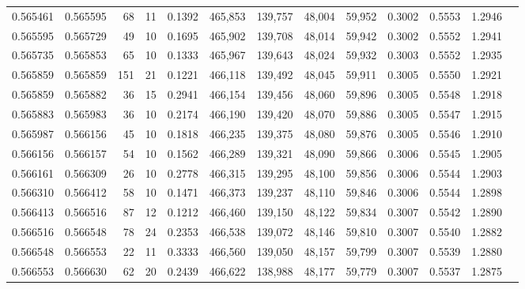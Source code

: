 \begin{tabular}{rrrrrrrrrrrrr}
0.565461 & 0.565595 &    68 &  11 &                                     0.1392 & 465,853 & 139,757 &  48,004 &  59,952 & 0.3002 & 0.5553 & 1.2946 \\
0.565595 & 0.565729 &    49 &  10 &                                     0.1695 & 465,902 & 139,708 &  48,014 &  59,942 & 0.3002 & 0.5552 & 1.2941 \\
0.565735 & 0.565853 &    65 &  10 &                                     0.1333 & 465,967 & 139,643 &  48,024 &  59,932 & 0.3003 & 0.5552 & 1.2935 \\
0.565859 & 0.565859 &   151 &  21 &                                     0.1221 & 466,118 & 139,492 &  48,045 &  59,911 & 0.3005 & 0.5550 & 1.2921 \\
0.565859 & 0.565882 &    36 &  15 &                                     0.2941 & 466,154 & 139,456 &  48,060 &  59,896 & 0.3005 & 0.5548 & 1.2918 \\
0.565883 & 0.565983 &    36 &  10 &                                     0.2174 & 466,190 & 139,420 &  48,070 &  59,886 & 0.3005 & 0.5547 & 1.2915 \\
0.565987 & 0.566156 &    45 &  10 &                                     0.1818 & 466,235 & 139,375 &  48,080 &  59,876 & 0.3005 & 0.5546 & 1.2910 \\
0.566156 & 0.566157 &    54 &  10 &                                     0.1562 & 466,289 & 139,321 &  48,090 &  59,866 & 0.3006 & 0.5545 & 1.2905 \\
0.566161 & 0.566309 &    26 &  10 &                                     0.2778 & 466,315 & 139,295 &  48,100 &  59,856 & 0.3006 & 0.5544 & 1.2903 \\
0.566310 & 0.566412 &    58 &  10 &                                     0.1471 & 466,373 & 139,237 &  48,110 &  59,846 & 0.3006 & 0.5544 & 1.2898 \\
0.566413 & 0.566516 &    87 &  12 &                                     0.1212 & 466,460 & 139,150 &  48,122 &  59,834 & 0.3007 & 0.5542 & 1.2890 \\
0.566516 & 0.566548 &    78 &  24 &                                     0.2353 & 466,538 & 139,072 &  48,146 &  59,810 & 0.3007 & 0.5540 & 1.2882 \\
0.566548 & 0.566553 &    22 &  11 &                                     0.3333 & 466,560 & 139,050 &  48,157 &  59,799 & 0.3007 & 0.5539 & 1.2880 \\
0.566553 & 0.566630 &    62 &  20 &                                     0.2439 & 466,622 & 138,988 &  48,177 &  59,779 & 0.3007 & 0.5537 & 1.2875 \\

\end{tabular}
